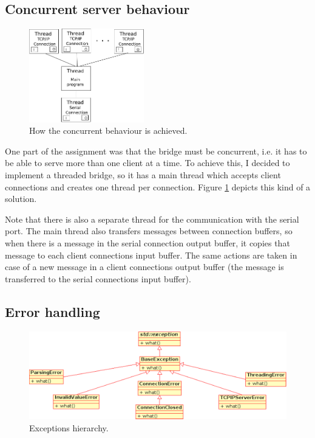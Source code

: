\subsection{Concurrent server behaviour}
\label{ConcurrentServerBehaviour}

\begin{figure}[ht!]
	\begin{center}
		\includegraphics[width=5cm,keepaspectratio]{concurrency}
		\caption{How the concurrent behaviour is achieved.}
		\label{concurrency}
	\end{center}
\end{figure}

One part of the assignment was that the bridge must be concurrent,
i.e. it has to be able to serve more than one client at a time. To achieve this,
I decided to implement a threaded bridge, so it has a main thread which accepts
client connections and creates one thread per connection.
Figure \ref{concurrency} depicts this kind of a solution.

Note that there is also a separate thread for the communication with the serial
port. The main thread also transfers messages between connection buffers,
so when there is a message in the serial connection output buffer, it
copies that message to each client connections input buffer. The same
actions are taken in case of a new message in a client connections output buffer
(the message is transferred to the serial connections input buffer).

\pagebreak
\subsection{Error handling}

\begin{figure}[ht!]
	\begin{center}
		\includegraphics[width=14cm,keepaspectratio]{exceptions-class-diagram}
		\caption{Exceptions hierarchy.}
		\label{exceptions-class-diagram}
	\end{center}
\end{figure}

